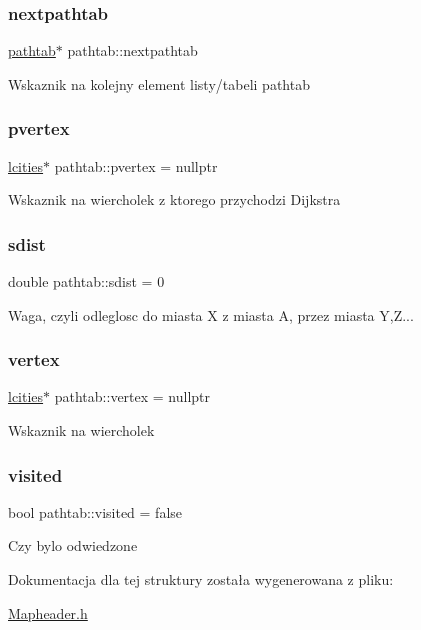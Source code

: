 \subsubsection{\texorpdfstring{nextpathtab}{nextpathtab}}
{\footnotesize\ttfamily \mbox{\hyperlink{structpathtab}{pathtab}}$\ast$ pathtab\+::nextpathtab}

Wskaznik na kolejny element listy/tabeli pathtab \mbox{\label{structpathtab_abccdc514a1353a851fa47bbc9afcdc5e}} 
\subsubsection{\texorpdfstring{pvertex}{pvertex}}
{\footnotesize\ttfamily \mbox{\hyperlink{structlcities}{lcities}}$\ast$ pathtab\+::pvertex = nullptr}

Wskaznik na wiercholek z ktorego przychodzi Dijkstra \mbox{\label{structpathtab_afdbd8fb4a4437e60b836f4623523d640}} 
\subsubsection{\texorpdfstring{sdist}{sdist}}
{\footnotesize\ttfamily double pathtab\+::sdist = 0}

Waga, czyli odleglosc do miasta X z miasta A, przez miasta Y,Z... \mbox{\label{structpathtab_a4d32b8ede66958e9599e773e754b5027}} 
\subsubsection{\texorpdfstring{vertex}{vertex}}
{\footnotesize\ttfamily \mbox{\hyperlink{structlcities}{lcities}}$\ast$ pathtab\+::vertex = nullptr}

Wskaznik na wiercholek \mbox{\label{structpathtab_a2af2d9ba6f3cff245e1f569e72ef43ff}} 
\subsubsection{\texorpdfstring{visited}{visited}}
{\footnotesize\ttfamily bool pathtab\+::visited = false}

Czy bylo odwiedzone 

Dokumentacja dla tej struktury została wygenerowana z pliku\+:\begin{DoxyCompactItemize}
\item 
\mbox{\hyperlink{_mapheader_8h}{Mapheader.\+h}}\end{DoxyCompactItemize}
